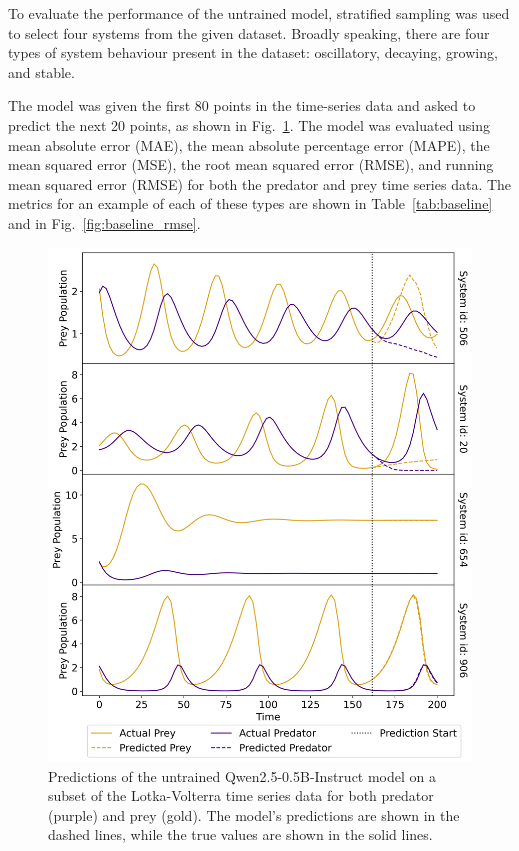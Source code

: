 \documentclass[11pt,a4paper]{article}
\begin{document}
To evaluate the performance of the untrained model, stratified sampling was used to select four systems from the given dataset. Broadly speaking, there are four types of system behaviour present in the dataset: oscillatory, decaying, growing, and stable. 

The model was given the first 80 points in the time-series data and asked to predict the next 20 points, as shown in Fig.~\ref{fig:baseline_pred}. The model was evaluated using mean absolute error (MAE), the mean absolute percentage error (MAPE), the mean squared error (MSE), the root mean squared error (RMSE), and running mean squared error (RMSE) for both the predator and prey time series data. The metrics for an example of each of these types are shown in Table~\ref{tab:baseline} and in Fig.~\ref{fig:baseline_rmse}.

\begin{figure}[h]
    \centering
    \includegraphics[width=\columnwidth, keepaspectratio]{../plots/predictions_example.png}
    \caption{Predictions of the untrained Qwen2.5-0.5B-Instruct model on a subset of the Lotka-Volterra time series data for both predator (purple) and prey (gold). The model's predictions are shown in the dashed lines, while the true values are shown in the solid lines.}
    \label{fig:baseline_pred}
\end{figure}
\end{document}
